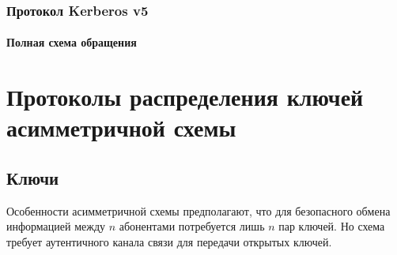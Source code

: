 \begin{frame}
    \frametitle{Протокол Kerberos v5}
    \framesubtitle{Полная схема обращения}
    
    \begin{figure}
        \begin{center}
        \end{center}
    \end{figure} 
\end{frame}


\section{Протоколы распределения ключей асимметричной схемы}


\subsection{Ключи}


Особенности асимметричной схемы предполагают, что для безопасного обмена информацией между $n$ абонентами потребуется лишь $n$ пар ключей. Но схема требует аутентичного канала связи для передачи открытых ключей.

